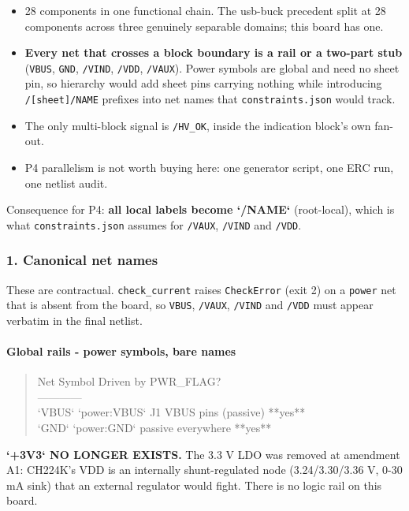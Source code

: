 \documentclass[11pt,a4paper]{article}
\begin{document}
\begin{itemize}
\item 28 components in one functional chain. The usb-buck precedent split at 28
components across three genuinely separable domains; this board has one.
\item \textbf{Every net that crosses a block boundary is a rail or a two-part stub}
(\texttt{VBUS}, \texttt{GND}, \texttt{/VIND}, \texttt{/VDD}, \texttt{/VAUX}). Power symbols are global and need no
sheet pin, so hierarchy would add sheet pins carrying nothing while introducing
\texttt{/{[}sheet{]}/NAME} prefixes into net names that \texttt{constraints.json} would track.
\item The only multi-block signal is \texttt{/HV\_OK}, inside the indication block's own
fan-out.
\item P4 parallelism is not worth buying here: one generator script, one ERC run,
one netlist audit.
\end{itemize}
Consequence for P4: \textbf{all local labels become `/NAME`} (root-local), which is what \texttt{constraints.json} assumes for \texttt{/VAUX}, \texttt{/VIND} and \texttt{/VDD}.

\subsubsection*{1. Canonical net names}
These are contractual. \texttt{check\_current} raises \texttt{CheckError} (exit 2) on a \texttt{power} net that is absent from the board, so \texttt{VBUS}, \texttt{/VAUX}, \texttt{/VIND} and \texttt{/VDD} must appear verbatim in the final netlist.

\paragraph*{Global rails - power symbols, bare names}
\begin{quote}\small\ttfamily\raggedright
\textbar{} Net \textbar{} Symbol \textbar{} Driven by \textbar{} PWR\_FLAG? \textbar{}\\
\textbar{}---\textbar{}---\textbar{}---\textbar{}---\textbar{}\\
\textbar{} `VBUS` \textbar{} `power:VBUS` \textbar{} J1 VBUS pins (passive) \textbar{} {*}{*}yes{*}{*} \textbar{}\\
\textbar{} `GND` \textbar{} `power:GND` \textbar{} passive everywhere \textbar{} {*}{*}yes{*}{*} \textbar{}
\end{quote}
\textbf{`+3V3` NO LONGER EXISTS.} The 3.3 V LDO was removed at amendment A1: CH224K's VDD is an internally shunt-regulated node (3.24/3.30/3.36 V, 0-30 mA sink) that an external regulator would fight. There is no logic rail on this board.
\end{document}
